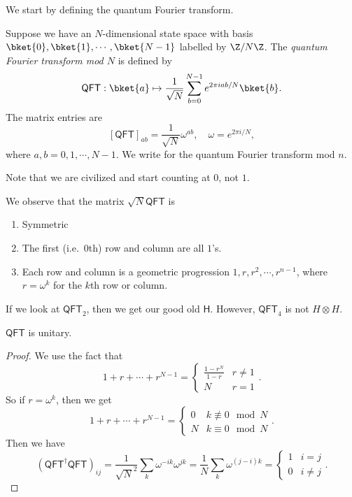 \documentclass[a4paper]{article}
\newcommand{\qQFT}{\mathsf{QFT}}
\newcommand{\qH}{\mathsf{H}}
\begin{document}
We start by defining the quantum Fourier transform.
\begin{defi}
  Suppose we have an $N$-dimensional state space with basis $\bket{0}, \bket{1}, \cdots, \bket{N - 1}$ labelled by $\Z/N\Z$. The \emph{quantum Fourier transform mod $N$} is defined by
  \[
    \qQFT: \bket{a} \mapsto \frac{1}{\sqrt{N}} \sum_{b = 0}^{N - 1} e^{2\pi i ab/N} \bket{b}.
  \]
  The matrix entries are
  \[
    [\qQFT]_{ab} = \frac{1}{\sqrt{N}} \omega^{ab},\quad \omega = e^{2\pi i/N},
  \]
  where $a, b = 0, 1, \cdots, N - 1$. We write \term{$\qQFT_n$} for the quantum Fourier transform mod $n$.
\end{defi}
Note that we are civilized and start counting at $0$, not $1$.

We observe that the matrix $\sqrt{N}\qQFT$ is
\begin{enumerate}
  \item Symmetric
  \item The first (i.e.\ $0$th) row and column are all $1$'s.
  \item Each row and column is a geometric progression $1, r, r^2, \cdots, r^{n - 1}$, where $r = \omega^k$ for the $k$th row or column.
\end{enumerate}

\begin{eg}
  If we look at $\qQFT_2$, then we get our good old $\qH$. However, $\qQFT_4$ is not $H \otimes H$.
\end{eg}

\begin{prop}
  $\qQFT$ is unitary.
\end{prop}

\begin{proof}
  We use the fact that
  \[
    1 + r + \cdots + r^{N - 1} =
    \begin{cases}
      \frac{1 - r^N}{1 - r} & r \not= 1\\
      N & r = 1
    \end{cases}.
  \]
  So if $r = \omega^k$, then we get
  \[
    1 + r + \cdots + r^{N - 1} =
    \begin{cases}
      0 & k \not\equiv 0 \mod N\\
      N & k \equiv 0 \mod N
    \end{cases}.
  \]
  Then we have
  \[
    (\qQFT^\dagger \qQFT)_{ij} = \frac{1}{\sqrt{N}^2} \sum_k \omega^{-ik} \omega^{jk} =\frac{1}{N} \sum_k \omega^{(j-i)k} =
    \begin{cases}
      1 & i = j\\
      0 & i \not= j
    \end{cases}.
  \]
\end{proof}
\end{document}
